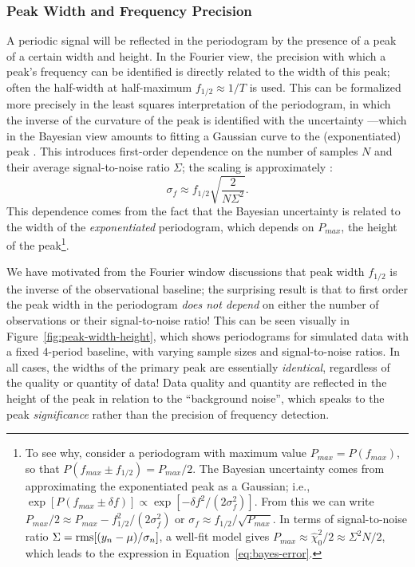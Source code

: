 \documentclass[preprint]{aastex}
\newcommand{\fig}[1]{Figure~\ref{fig:#1}}
\newcommand{\Eq}[1]{Equation~\ref{eq:#1}}
\newcommand{\eq}[1]{\Eq{#1}}
\newcommand{\eqlabel}[1]{\label{eq:#1}}
\begin{document}
\subsubsection{Peak Width and Frequency Precision}

A periodic signal will be reflected in the periodogram by the presence of a
peak of a certain width and height.
In the Fourier view, the precision with which a peak's frequency can be
identified is directly related to the width of this peak; often the
half-width at half-maximum $f_{1/2} \approx 1/T$ is used.
This can be formalized more precisely in the least squares interpretation of
the periodogram, in which the inverse of the curvature of the peak is
identified with the uncertainty \citep{ICVG2014}---which in the Bayesian
view amounts to fitting a Gaussian curve to the (exponentiated)
peak \citep{Jaynes87, Bretthorst88}. This introduces first-order
dependence on the number of samples $N$ and their average signal-to-noise
ratio $\Sigma$; the scaling is approximately \citep[see, e.g.][]{Gregory2001}:
\begin{equation}
  \sigma_f \approx f_{1/2} \sqrt{\frac{2}{N\Sigma^2}}.
  \eqlabel{bayes-error}
\end{equation}
This dependence comes from the fact that the Bayesian uncertainty is related
to the width of the {\it exponentiated} periodogram, which
depends on $P_{max}$, the height of the peak\footnote{
To see why, consider a periodogram with maximum value
$P_{max} = P(f_{max})$, so that $P(f_{max} \pm f_{1/2}) = P_{max}/2$.
The Bayesian uncertainty comes from approximating the exponentiated peak as a
Gaussian; i.e., $\exp[P(f_{max} \pm \delta f)] \propto \exp[-\delta f^2/(2\sigma_f^2)]$.
From this we can write $P_{max}/2 \approx P_{max} -f_{1/2}^2 / (2 \sigma_f^2)$ or
$\sigma_f \approx f_{1/2} / \sqrt{P_{max}}$.
In terms of signal-to-noise ratio
$\Sigma = {\rm rms}[(y_n - \mu) / \sigma_n]$,
a well-fit model gives
$P_{max} \approx \hat{\chi}_0^2/2 \approx \Sigma^2 N/2$,
which leads to the expression in \eq{bayes-error}.
}.


We have motivated from the Fourier window discussions that peak width $f_{1/2}$
is the inverse of the observational baseline; the surprising result is that to
first order the peak width in the periodogram {\it does not depend} on
either the number of observations or their signal-to-noise ratio!
This can be seen visually in \fig{peak-width-height},
which shows periodograms for simulated data with a fixed 4-period baseline,
with varying sample sizes and signal-to-noise ratios.
In all cases, the widths of the primary peak are essentially {\it identical},
regardless of the quality or quantity of data!
Data quality and quantity are reflected in the height of the peak in relation
to the ``background noise'', which speaks to the peak {\it significance} rather
than the precision of frequency detection.
\end{document}
